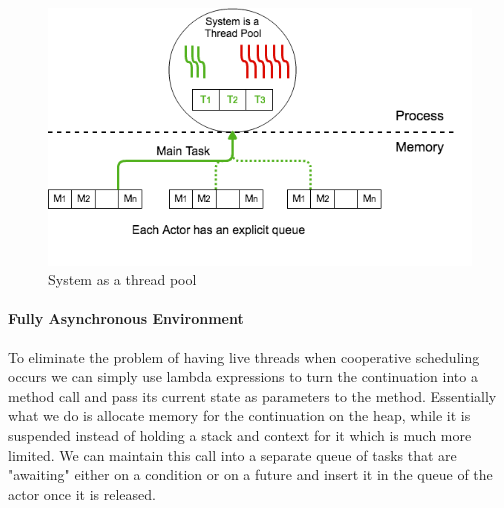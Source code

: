 \begin{figure}
	\label{stp}
	\centering
	\includegraphics[scale=0.5]{stp.png}
	\caption{System as a thread pool}
\end{figure}

\paragraph{Fully Asynchronous Environment}
To eliminate the problem of having live threads when cooperative scheduling occurs we can simply use lambda expressions to turn the continuation into a method call and pass its current state as parameters to the method. Essentially what we do is allocate memory for the continuation on the heap, while it is suspended instead of holding a stack and context for it which is much more limited.  We can maintain this call into a separate queue of tasks that are "awaiting" either  on a condition or on a future and insert it in the queue of the actor once it is released. 


